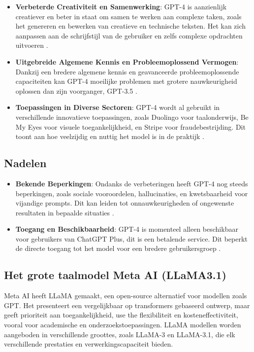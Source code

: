 \begin{itemize}
    \item \textbf{Verbeterde Creativiteit en Samenwerking}: GPT-4 is aanzienlijk creatiever en beter in staat om samen te werken aan complexe taken, zoals het genereren en bewerken van creatieve en technische teksten. Het kan zich aanpassen aan de schrijfstijl van de gebruiker en zelfs complexe opdrachten uitvoeren \autocite{openai_gpt4}.
    \item \textbf{Uitgebreide Algemene Kennis en Probleemoplossend Vermogen}: Dankzij een bredere algemene kennis en geavanceerde probleemoplossende capaciteiten kan GPT-4 moeilijke problemen met grotere nauwkeurigheid oplossen dan zijn voorganger, GPT-3.5 \autocite{openai_gpt4}.
    \item \textbf{Toepassingen in Diverse Sectoren}: GPT-4 wordt al gebruikt in verschillende innovatieve toepassingen, zoals Duolingo voor taalonderwijs, Be My Eyes voor visuele toegankelijkheid, en Stripe voor fraudebestrijding. Dit toont aan hoe veelzijdig en nuttig het model is in de praktijk \autocite{openai_gpt4}.
\end{itemize}

\subsection*{Nadelen}
\begin{itemize}
    \item \textbf{Bekende Beperkingen}: Ondanks de verbeteringen heeft GPT-4 nog steeds beperkingen, zoals sociale vooroordelen, hallucinaties, en kwetsbaarheid voor vijandige prompts. Dit kan leiden tot onnauwkeurigheden of ongewenste resultaten in bepaalde situaties \autocite{openai_gpt4}.
    \item \textbf{Toegang en Beschikbaarheid}: GPT-4 is momenteel alleen beschikbaar voor gebruikers van ChatGPT Plus, dit is een betalende service. Dit beperkt de directe toegang tot het model voor een bredere gebruikersgroep \autocite{openai_gpt4}.
\end{itemize}





\subsection{Het grote taalmodel Meta AI (LLaMA3.1)}

Meta AI heeft LLaMA gemaakt, een open-source alternatief voor modellen zoals GPT. Het presenteert een vergelijkbaar op transformers gebaseerd ontwerp, maar geeft prioriteit aan toegankelijkheid, use the flexibiliteit en kosteneffectiviteit, vooral voor academische en onderzoekstoepassingen. LLaMA modellen worden aangeboden in verschillende groottes, zoals LLaMA-3 en LLaMA-3.1, die elk verschillende prestaties en verwerkingscapaciteit bieden.

